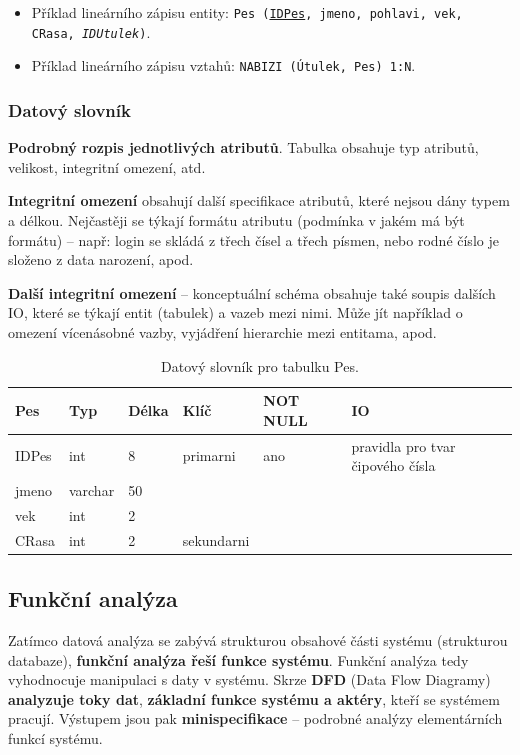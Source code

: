 \begin{itemize}
\item Příklad lineárního zápisu entity: \texttt{Pes (\underline{IDPes}, jmeno, pohlavi, vek, CRasa, \textit{IDUtulek})}.
\item Příklad lineárního zápisu vztahů: \texttt{NABIZI (Útulek, Pes) 1:N}.
\end{itemize}

\subsubsection{Datový slovník}
\textbf{Podrobný rozpis jednotlivých atributů}. Tabulka obsahuje typ atributů, velikost, integritní omezení, atd. 

\textbf{Integritní omezení} obsahují další specifikace atributů, které nejsou dány typem a délkou. Nejčastěji se týkají formátu atributu (podmínka v jakém má být formátu) -- např: login se skládá z třech čísel a třech písmen, nebo rodné číslo je složeno z data narození, apod.

\textbf{Další integritní omezení} -- konceptuální schéma obsahuje také soupis dalších IO, které se týkají entit (tabulek) a vazeb mezi nimi. Může jít například o omezení vícenásobné vazby, vyjádření hierarchie mezi entitama, apod. 

\begin{table}[H]
	\centering
	\begin{tabular}{|l|l|l|l|l|l|}
		\hline
		\textbf{Pes} & \textbf{Typ} & \textbf{Délka} & \textbf{Klíč} & \textbf{NOT NULL} & \textbf{IO}                      \\ \hline
		IDPes        & int          & 8              & primarni      & ano               & pravidla pro tvar čipového čísla \\ \hline
		jmeno        & varchar      & 50             &               &                   &                                  \\ \hline
		vek          & int          & 2              &               &                   &                                  \\ \hline
		CRasa        & int          & 2              & sekundarni    &                   &                                  \\ \hline
	\end{tabular}
\caption{Datový slovník pro tabulku Pes.}
\end{table}

\subsection{Funkční analýza}
Zatímco datová analýza se zabývá strukturou obsahové části systému (strukturou databaze), \textbf{funkční analýza řeší funkce systému}. Funkční analýza tedy vyhodnocuje manipulaci s daty v systému. Skrze \textbf{DFD} (Data Flow Diagramy) \textbf{analyzuje toky dat}, \textbf{základní funkce systému a aktéry}, kteří se systémem pracují. Výstupem jsou pak \textbf{minispecifikace} -- podrobné analýzy elementárních funkcí systému. 


